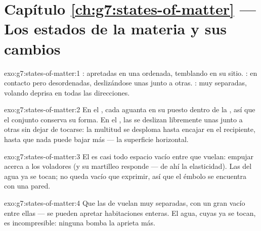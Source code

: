 \section*{Capítulo \ref{ch:g7:states-of-matter} --- Los estados de la materia y sus cambios}

\begin{solution}{exo:g7:states-of-matter:1}
:  apretadas en una  ordenada, temblando en
su sitio. :  en contacto pero
desordenadas, deslizándose unas junto a otras. :
 muy separadas, volando deprisa en todas las direcciones.
\end{solution}

\begin{solution}{exo:g7:states-of-matter:2}
En el , cada  aguanta en su puesto dentro de la
, así que el conjunto conserva su forma. En el , las
 se deslizan libremente unas junto a otras sin dejar de
tocarse: la multitud se desploma hasta encajar en el recipiente, hasta
que nada puede bajar más --- la superficie horizontal.
\end{solution}

\begin{solution}{exo:g7:states-of-matter:3}
El  es casi todo espacio vacío entre  que vuelan:
empujar acerca a los voladores (y su martilleo responde --- de ahí la
elasticidad). Las  del agua ya se tocan; no queda vacío
que exprimir, así que el émbolo se encuentra con una pared.
\end{solution}

\begin{solution}{exo:g7:states-of-matter:4}
Que las  de  vuelan muy separadas, con un gran vacío
entre ellas --- se pueden apretar habitaciones enteras. El agua, cuyas
 ya se tocan, es incompresible: ninguna bomba la aprieta
más.
\end{solution}

